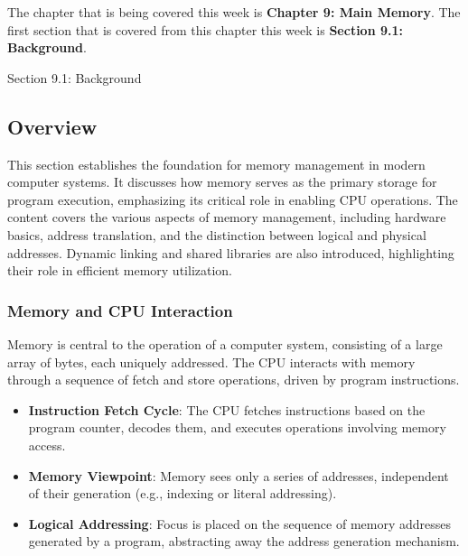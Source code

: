The chapter that is being covered this week is \textbf{Chapter 9: Main Memory}. The first section that is covered from this chapter this week is \textbf{Section 9.1: Background}.

\begin{notes}{Section 9.1: Background}
    \subsection*{Overview}

    This section establishes the foundation for memory management in modern computer systems. It discusses how memory serves as the primary storage for program execution, emphasizing its critical 
    role in enabling CPU operations. The content covers the various aspects of memory management, including hardware basics, address translation, and the distinction between logical and physical 
    addresses. Dynamic linking and shared libraries are also introduced, highlighting their role in efficient memory utilization.
    
    \subsubsection*{Memory and CPU Interaction}
    
    Memory is central to the operation of a computer system, consisting of a large array of bytes, each uniquely addressed. The CPU interacts with memory through a sequence of fetch and store 
    operations, driven by program instructions.
    
    \begin{highlight}
    
        \begin{itemize}
            \item \textbf{Instruction Fetch Cycle}: The CPU fetches instructions based on the program counter, decodes them, and executes operations involving memory access.
            \item \textbf{Memory Viewpoint}: Memory sees only a series of addresses, independent of their generation (e.g., indexing or literal addressing).
            \item \textbf{Logical Addressing}: Focus is placed on the sequence of memory addresses generated by a program, abstracting away the address generation mechanism.
        \end{itemize}
    
    \end{highlight}
    

\end{notes}
